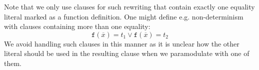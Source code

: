 Note that we only use clauses for such rewriting that contain exactly one equality literal marked as a function definition. One might define e.g. non-determinism with clauses containing more than one equality:
$$\mathtt{f}(\overline{x})=t_1\lor \mathtt{f}(\overline{x})=t_2$$
We avoid handling such clauses in this manner as it is unclear how the other literal should be used in the resulting clause when we paramodulate with one of them.
